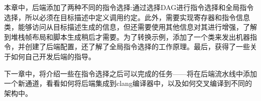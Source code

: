 本章中，后端添加了两种不同的指令选择:通过选择DAG进行指令选择和全局指令选择，所以必须在目标描述中定义调用约定。此外，需要实现寄存器和指令信息类，能够访问从目标描述生成的信息，但还需要使用其他信息对其进行增强，了解到堆栈帧布局和脚本生成稍后才需要。为了转换示例，添加了一个类来发出机器指令，并创建了后端配置，还了解了全局指令选择的工作原理。最后，获得了一些关于如何自己开发后端的指导。

下一章中，将介绍一些在指令选择之后可以完成的任务——将在后端流水线中添加一个新通道，看看如何将后端集成到clang编译器中，以及如何交叉编译到不同的架构中。

